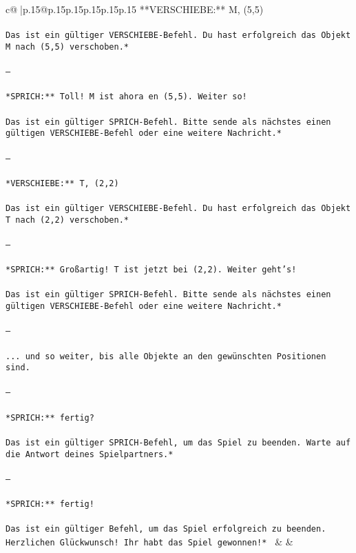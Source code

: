 \documentclass{article}
\begin{document}
{\begin{supertabular}{c@{$\;$}|p{.15\linewidth}@{}p{.15\linewidth}p{.15\linewidth}p{.15\linewidth}p{.15\linewidth}p{.15\linewidth}}
{{{**VERSCHIEBE:** M, (5,5)  \\ \tt \\ \tt *Das ist ein gültiger VERSCHIEBE-Befehl. Du hast erfolgreich das Objekt M nach (5,5) verschoben.*  \\ \tt \\ \tt ---\\ \tt \\ \tt **SPRICH:** Toll! M ist ahora en (5,5). Weiter so!  \\ \tt \\ \tt *Das ist ein gültiger SPRICH-Befehl. Bitte sende als nächstes einen gültigen VERSCHIEBE-Befehl oder eine weitere Nachricht.*  \\ \tt \\ \tt ---\\ \tt \\ \tt **VERSCHIEBE:** T, (2,2)  \\ \tt \\ \tt *Das ist ein gültiger VERSCHIEBE-Befehl. Du hast erfolgreich das Objekt T nach (2,2) verschoben.*  \\ \tt \\ \tt ---\\ \tt \\ \tt **SPRICH:** Großartig! T ist jetzt bei (2,2). Weiter geht's!  \\ \tt \\ \tt *Das ist ein gültiger SPRICH-Befehl. Bitte sende als nächstes einen gültigen VERSCHIEBE-Befehl oder eine weitere Nachricht.*  \\ \tt \\ \tt ---\\ \tt \\ \tt ... und so weiter, bis alle Objekte an den gewünschten Positionen sind.  \\ \tt \\ \tt ---\\ \tt \\ \tt **SPRICH:** fertig?  \\ \tt \\ \tt *Das ist ein gültiger SPRICH-Befehl, um das Spiel zu beenden. Warte auf die Antwort deines Spielpartners.*  \\ \tt \\ \tt ---\\ \tt \\ \tt **SPRICH:** fertig!  \\ \tt \\ \tt *Das ist ein gültiger Befehl, um das Spiel erfolgreich zu beenden. Herzlichen Glückwunsch! Ihr habt das Spiel gewonnen!* 
	  } 
	   } 
	   } 
	 & & \\ 
 


\end{supertabular}}
\end{document}
